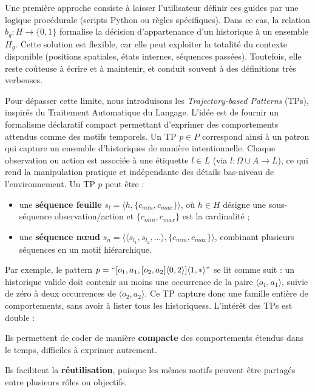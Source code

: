 \documentclass[francais,ROIA,Unicode,manuscript]{cedram}
\begin{document}
Une première approche consiste à laisser l’utilisateur définir ces guides par une logique procédurale (scripts Python ou règles spécifiques). Dans ce cas, la relation \(b_g: H \to \{0,1\}\) formalise la décision d’appartenance d’un historique à un ensemble \(H_g\). Cette solution est flexible, car elle peut exploiter la totalité du contexte disponible (positions spatiales, états internes, séquences passées). Toutefois, elle reste coûteuse à écrire et à maintenir, et conduit souvent à des définitions très verbeuses.

Pour dépasser cette limite, nous introduisons les \textit{Trajectory-based Patterns} (TPs), inspirés du Traitement Automatique du Langage. L’idée est de fournir un formalisme déclaratif compact permettant d’exprimer des comportements attendus comme des motifs temporels. Un TP \(p \in P\) correspond ainsi à un patron qui capture un ensemble d’historiques de manière intentionnelle. Chaque observation ou action est associée à une étiquette \(l \in L\) (via \(l: \Omega \cup A \to L\)), ce qui rend la manipulation pratique et indépendante des détails bas-niveau de l’environnement.
%
Un TP \(p\) peut être :
\begin{itemize}
    \item une \textbf{séquence feuille} \(s_l = \langle h, \{c_{min}, c_{max}\} \rangle\), où \(h \in H\) désigne une sous-séquence observation/action et \(\{c_{min}, c_{max}\}\) est la cardinalité ;
    \item une \textbf{séquence nœud} \(s_n = \langle \langle s_{l_1}, s_{l_2}, \dots \rangle, \{c_{min}, c_{max}\} \rangle\), combinant plusieurs séquences en un motif hiérarchique.
\end{itemize}

\noindent
Par exemple, le pattern
%
$p = ``[o_1,a_1,[o_2,a_2]\langle0,2\rangle]\langle1,*\rangle"$
%
se lit comme suit : un historique valide doit contenir au moins une occurrence de la paire \(\langle o_1,a_1\rangle\), suivie de zéro à deux occurrences de \(\langle o_2,a_2\rangle\). Ce TP capture donc une famille entière de comportements, sans avoir à lister tous les historiquess.
%
%
L’intérêt des TPs est double :
\begin{enumerate*}[label={\roman*) },itemjoin={; \quad}]
    \item Ils permettent de coder de manière \textbf{compacte} des comportements étendus dans le temps, difficiles à exprimer autrement.
    \item Ils facilitent la \textbf{réutilisation}, puisque les mêmes motifs peuvent être partagés entre plusieurs rôles ou objectifs.
\end{enumerate*}
\end{document}
